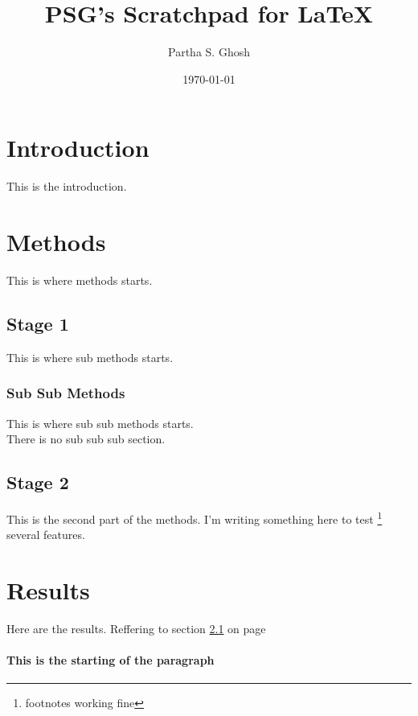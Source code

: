 \documentclass[a4paper, 12pt]{article}
\begin{document}
\title{PSG's Scratchpad for \LaTeX{}}
\author{Partha S. Ghosh}
\date{\today}
\maketitle

\tableofcontents
\newpage
{}


\section{Introduction}
This is the introduction.
\section{Methods}
This is where methods starts.

\subsection{Stage 1}
\label{sec1}
This is where sub methods starts.
\subsubsection{Sub Sub Methods}
This is where sub sub methods starts.\\
There is no sub sub sub section.

\subsection{Stage 2}
This is the second part of the methods. I'm writing something here to test \footnote{footnotes working fine}
several features.

\section{Results}
Here are the results. Reffering to section \ref{sec1} on page \pageref{sec1}

\paragraph{This is the starting of the paragraph}
\end{document}
